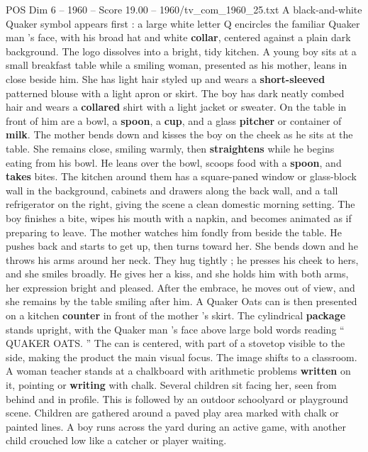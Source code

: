 \begin{textsample}{POS Dim 6 – 1960 – Score 19.00 – 1960/tv\_com\_1960\_25.txt}  \label{ex:f6_pos_021}
A black-and-white Quaker symbol appears first : a large white letter Q encircles the familiar Quaker man ’s face, with his broad hat and white \textbf{collar}, centered against a plain dark background.
The logo dissolves into a bright, tidy kitchen.
A young boy sits at a small breakfast table while a smiling woman, presented as his mother, leans in close beside him.
She has light hair styled up and wears a \textbf{short-sleeved} patterned blouse with a light apron or skirt.
The boy has dark neatly combed hair and wears a \textbf{collared} shirt with a light jacket or sweater.
On the table in front of him are a bowl, a \textbf{spoon}, a \textbf{cup}, and a glass \textbf{pitcher} or container of \textbf{milk}.
The mother bends down and kisses the boy on the cheek as he sits at the table.
She remains close, smiling warmly, then \textbf{straightens} while he begins eating from his bowl.
He leans over the bowl, scoops food with a \textbf{spoon}, and \textbf{takes} bites.
The kitchen around them has a square-paned window or glass-block wall in the background, cabinets and drawers along the back wall, and a tall refrigerator on the right, giving the scene a clean domestic morning setting.
The boy finishes a bite, wipes his mouth with a napkin, and becomes animated as if preparing to leave.
The mother watches him fondly from beside the table.
He pushes back and starts to get up, then turns toward her.
She bends down and he throws his arms around her neck.
They hug tightly ; he presses his cheek to hers, and she smiles broadly.
He gives her a kiss, and she holds him with both arms, her expression bright and pleased.
After the embrace, he moves out of view, and she remains by the table smiling after him.
A Quaker Oats can is then presented on a kitchen \textbf{counter} in front of the mother ’s skirt.
The cylindrical \textbf{package} stands upright, with the Quaker man ’s face above large bold words reading “ QUAKER OATS. ” The can is centered, with part of a stovetop visible to the side, making the product the main visual focus.
The image shifts to a classroom.
A woman teacher stands at a chalkboard with arithmetic problems \textbf{written} on it, pointing or \textbf{writing} with chalk.
Several children sit facing her, seen from behind and in profile.
This is followed by an outdoor schoolyard or playground scene.
Children are gathered around a paved play area marked with chalk or painted lines.
A boy runs across the yard during an active game, with another child crouched low like a catcher or player waiting.

\end{textsample}
